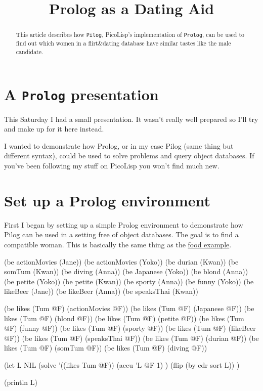 \title{Prolog as a Dating Aid}

\maketitle


\begin{abstract}
  This article describes how \texttt{Pilog}, PicoLisp's implementation
  of \texttt{Prolog}, can be used to find out which women in a
  flirt\&dating database have similar tastes like the male
  candidate. 
\end{abstract}

\section{A \texttt{Prolog} presentation}
\label{sec:prolog-dat-aid-a-prolog-presentation}

This Saturday I had a small presentation. It wasn't really well prepared
so I'll try and make up for it here instead.

I wanted to demonstrate how Prolog, or in my case Pilog (same thing but
different syntax), could be used to solve problems and query object
databases. If you've been following my stuff on PicoLisp you won't find
much new.

\section{Set up a Prolog environment}
\label{sec:prolog-dat-aid-set-up-a-prolog-environment}

First I began by setting up a simple Prolog environment to demonstrate
how Pilog can be used in a setting free of object databases. The goal is
to find a compatible woman. This is basically the same thing as the
\href{http://www.prodevtips.com/2008/04/28/advanced-oodb-in-pico-lisp/}{food example}.


\begin{wideverbatim}
(be actionMovies (Jane))
(be actionMovies (Yoko))
(be durian (Kwan))
(be somTum (Kwan))
(be diving (Anna))
(be Japanese (Yoko))
(be blond (Anna))
(be petite (Yoko))
(be petite (Kwan))
(be sporty (Anna))
(be funny (Yoko))
(be likeBeer (Jane))
(be likeBeer (Anna))
(be speaksThai (Kwan))

(be likes (Tum @F) (actionMovies @F))
(be likes (Tum @F) (Japanese @F))
(be likes (Tum @F) (blond @F))
(be likes (Tum @F) (petite @F))
(be likes (Tum @F) (funny @F))
(be likes (Tum @F) (sporty @F))
(be likes (Tum @F) (likeBeer @F))
(be likes (Tum @F) (speaksThai @F))
(be likes (Tum @F) (durian @F))
(be likes (Tum @F) (somTum @F))
(be likes (Tum @F) (diving @F))

(let L NIL
        (solve '((likes Tum @F))
           (accu 'L @F 1) )
        (flip (by cdr sort L)) )

(println L)
\end{wideverbatim}

